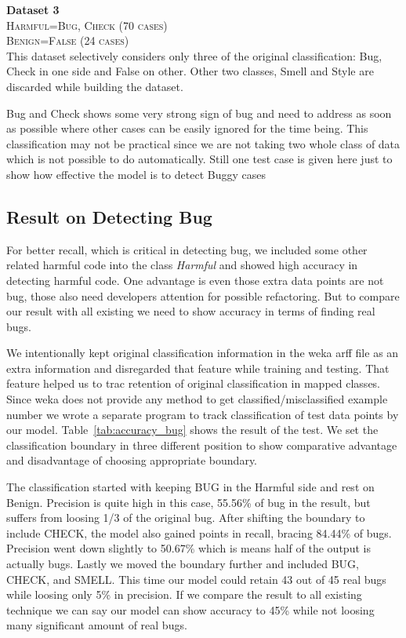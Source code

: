 \documentclass[nocopyrightspace]{sigplanconf}
\begin{document}
\vspace{10 pt}
\noindent
\textbf{Dataset 3}\\
\textsc{Harmful=Bug, Check (70 cases)}\\
\textsc{Benign=False (24 cases)}\\

\noindent
This dataset selectively considers only three of the original classification: Bug, Check in one side and False on other. Other two classes, Smell and Style are discarded while building the dataset.

\vspace{10pt}
\noindent
Bug and Check shows some very strong sign of bug and need to address as soon as possible where other cases can be easily ignored for the time being. This classification may not be practical since we are not taking two whole class of data which is not possible to do automatically. Still one test case is given here just to show how effective the model is to detect Buggy cases

\subsection{Result on Detecting Bug}
For better recall, which is critical in detecting bug, we included some other related harmful code into the class \emph{Harmful} and showed high accuracy in detecting harmful code. One advantage is even those extra data points are not bug, those also need developers attention for possible refactoring. But to compare our result with all existing we need to show accuracy in terms of finding real bugs.

\vspace{10pt}
\noindent
We intentionally kept original classification information in the weka arff file as an extra information and disregarded that feature while training and testing. That feature helped us to trac retention of original classification in mapped classes. Since weka does not provide any method to get classified/misclassified example number we wrote a separate program to track classification of test data points by our model. Table~\ref{tab:accuracy_bug} shows the result of the test. We set the classification boundary in three different position to show comparative advantage and disadvantage of choosing appropriate boundary.

\vspace{10pt}
\noindent
The classification started with keeping BUG in the Harmful side and rest on Benign. Precision is quite high in this case, 55.56\% of bug in the result, but suffers from loosing 1/3 of the original bug. After shifting the boundary to include CHECK, the model also gained points in recall, bracing 84.44\% of bugs. Precision went down slightly to 50.67\% which is means half of the output is actually bugs. Lastly we moved the boundary further and included BUG, CHECK, and SMELL. This time our model could retain 43 out of 45 real bugs while loosing only 5\% in precision. If we compare the result to all existing technique we can say our model can show accuracy to 45\% while not loosing many significant amount of real bugs.
\end{document}
